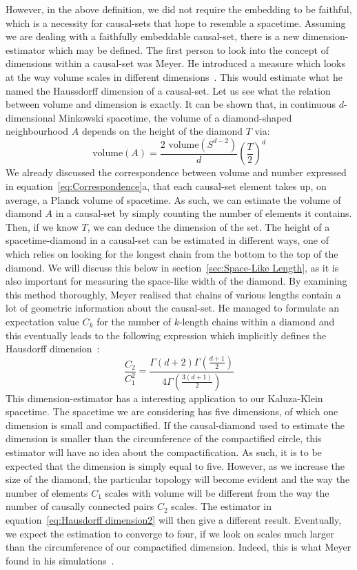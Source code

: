\documentclass[a4paper,12pt]{article}
\numberwithin{equation}{section}
\begin{document}
However, in the above definition, we did not require the embedding to be faithful, which is a necessity for causal-sets that hope to resemble a spacetime. Assuming we are dealing with a faithfully embeddable causal-set, there is a new dimension-estimator which may be defined. The first person to look into the concept of dimensions within a causal-set was Meyer. He introduced a measure which looks at the way volume scales in different dimensions~\cite{Meyer1988}. This would estimate what he named the Haussdorff dimension of a causal-set. Let us see what the relation between volume and dimension is exactly. It can be shown that, in continuous $d$-dimensional Minkowski spacetime, the volume of a diamond-shaped neighbourhood $A$ depends on the height of the diamond $T$ via:
\begin{equation}
\label{eq:Hausdorff dimension}
\text{volume}(A)=\frac{2 \text{ volume}(S^{d-2})}{d} \left(\frac{T}{2}\right)^d
\end{equation}
We already discussed the correspondence between volume and number expressed in equation~\ref{eq:Correspondence}a, that each causal-set element takes up, on average, a Planck volume of spacetime. As such, we can estimate the volume of diamond $A$ in a causal-set by simply counting the number of elements it contains. Then, if we know $T$, we can deduce the dimension of the set. The height of a spacetime-diamond in a causal-set can be estimated in different ways, one of which relies on looking for the longest chain from the bottom to the top of the diamond. We will discuss this below in section~\ref{sec:Space-Like Length}, as it is also important for measuring the space-like width of the diamond. By examining this method thoroughly, Meyer realised that chains of various lengths contain a lot of geometric information about the causal-set. He managed to formulate an expectation value $C_k$ for the number of $k$-length chains within a diamond and this eventually leads to the following expression which implicitly defines the Hausdorff dimension~\cite{Meyer1988}:
\begin{equation}
\label{eq:Hausdorff dimension2}
\frac{C_2}{C_1^2}=\frac{\Gamma(d+2)\Gamma(\frac{d+1}{2})}{4\Gamma(\frac{3(d+1)}{2})}
\end{equation}
This dimension-estimator has a interesting application to our Kaluza-Klein spacetime. The spacetime we are considering has five dimensions, of which one dimension is small and compactified. If the causal-diamond used to estimate the dimension is smaller than the circumference of the compactified circle, this estimator will have no idea about the compactification. As such, it is to be expected that the dimension is simply equal to five. However, as we increase the size of the diamond, the particular topology will become evident and the way the number of elements $C_1$ scales with volume will be different from the way the number of causally connected pairs $C_2$ scales. The estimator in equation~\ref{eq:Hausdorff dimension2} will then give a different result. Eventually, we expect the estimation to converge to four, if we look on scales much larger than the circumference of our compactified dimension. Indeed, this is what Meyer found in his simulations~\cite{Meyer1988}.
\end{document}

